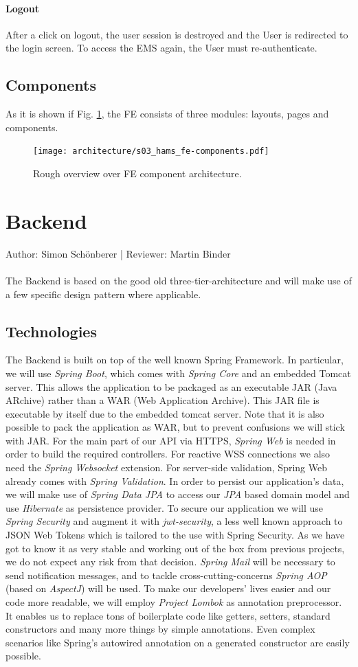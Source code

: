 \documentclass{scrreprt}
\begin{document}
\paragraph{Logout}
After a click on logout, the user session is destroyed and the User is redirected to the login
screen. To access the EMS again, the User must re-authenticate.
\subsection{Components}
As it is shown if Fig. \ref{fecomp}, the FE consists of three modules: layouts, pages and 
components.
\begin{figure}[!h]
	\centering
	\texttt{[image: architecture/s03\_hams\_fe-components.pdf]}
	\caption{Rough overview over FE component architecture.}
	\label{fecomp}
\end{figure}
\section{Backend}
Author: Simon Sch\"onberer | Reviewer: Martin Binder\\  \\
The Backend is based on the good old three-tier-architecture and will make use of a few specific
design pattern where applicable.
\subsection{Technologies}
The Backend is built on top of the well known Spring Framework. In particular, we will use
\emph{Spring Boot}, which comes with \emph{Spring Core} and an embedded Tomcat server. This
allows the application to be packaged as an executable JAR (Java ARchive) rather than a
WAR (Web Application Archive). This JAR file is executable by itself due to the embedded tomcat
server. Note that it is also possible to pack the application as WAR, but to prevent confusions
we will stick with JAR.
For the main part of our API via HTTPS, \emph{Spring Web} is needed in order to build the
required controllers. For reactive WSS connections we also need the \emph{Spring Websocket}
extension. For server-side validation, Spring Web already comes with \emph{Spring Validation}.
In order to persist our application's data, we will make use of \emph{Spring Data JPA} to 
access our \emph{JPA} based domain model and use \emph{Hibernate} as persistence provider.
To secure our application we will use \emph{Spring Security} and augment it with
\emph{jwt-security}, a less well known approach to JSON Web Tokens which is tailored to the
use with Spring Security. As we have got to know it as very stable and working out of the
box from previous projects, we do not expect any risk from that decision.
\emph{Spring Mail} will be necessary to send notification messages, and to tackle
cross-cutting-concerns \emph{Spring AOP} (based on \emph{AspectJ}) will be used.
To make our developers' lives easier and our code more readable, we will employ \emph{Project Lombok}
as annotation preprocessor. It enables us to replace tons of boilerplate code like getters,
setters, standard constructors and many more things by simple annotations. Even complex scenarios
like Spring's autowired annotation on a generated constructor are easily possible.
\end{document}
